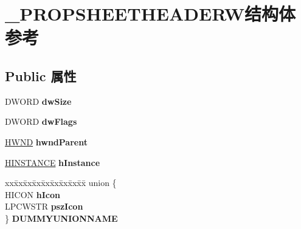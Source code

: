 \hypertarget{struct___p_r_o_p_s_h_e_e_t_h_e_a_d_e_r_w}{}\section{\+\_\+\+P\+R\+O\+P\+S\+H\+E\+E\+T\+H\+E\+A\+D\+E\+R\+W结构体 参考}
\label{struct___p_r_o_p_s_h_e_e_t_h_e_a_d_e_r_w}
\subsection*{Public 属性}
\begin{DoxyCompactItemize}
\item 
\mbox{\label{struct___p_r_o_p_s_h_e_e_t_h_e_a_d_e_r_w_a2b81cfbe3060154b15608144798f179b}} 
D\+W\+O\+RD {\bfseries dw\+Size}
\item 
\mbox{\label{struct___p_r_o_p_s_h_e_e_t_h_e_a_d_e_r_w_a571d544da0578a6d2bfb69ee574edb71}} 
D\+W\+O\+RD {\bfseries dw\+Flags}
\item 
\mbox{\label{struct___p_r_o_p_s_h_e_e_t_h_e_a_d_e_r_w_a65d94aa581da76cc98f9899aef762cd4}} 
\hyperlink{interfacevoid}{H\+W\+ND} {\bfseries hwnd\+Parent}
\item 
\mbox{\label{struct___p_r_o_p_s_h_e_e_t_h_e_a_d_e_r_w_a2a5c604493d82883565f60918b442ac2}} 
\hyperlink{interfacevoid}{H\+I\+N\+S\+T\+A\+N\+CE} {\bfseries h\+Instance}
\item 
\mbox{\label{struct___p_r_o_p_s_h_e_e_t_h_e_a_d_e_r_w_a962e4a1a38f27794469c5229b465b535}} 
\begin{tabbing}
xx\=xx\=xx\=xx\=xx\=xx\=xx\=xx\=xx\=\kill
union \{\\
\>HICON {\bfseries hIcon}\\
\>LPCWSTR {\bfseries pszIcon}\\
\} {\bfseries DUMMYUNIONNAME}\\


\end{tabbing}
\end{DoxyCompactItemize}

